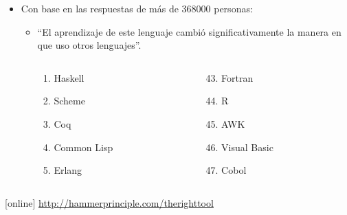 \documentclass[spanish]{beamer}
\begin{document}

\begin{frame}
  \begin{itemize}
  \item
    Con base en las respuestas de más de 368000 personas:
    \begin{itemize}
    \item
      ``El aprendizaje de este lenguaje cambió significativamente la
      manera en que uso otros lenguajes''.
      \begin{columns}[T]
        \begin{column}{3cm}
          \begin{enumerate}
          \item Haskell
          \item Scheme
          \item Coq
          \item Common Lisp
          \item Erlang
          \end{enumerate}
        \end{column}
        \begin{column}{3cm}
          \begin{enumerate}
          \setcounter{enumi}{42}
          \item Fortran
          \item R
          \item AWK
          \item Visual Basic
          \item Cobol
          \end{enumerate}
        \end{column}
      \end{columns}
    \end{itemize}
  \end{itemize}
  \begin{thebibliography}{}
  [online]
    \newblock \url{http://hammerprinciple.com/therighttool}
  \end{thebibliography}
\end{frame}

\end{document}
